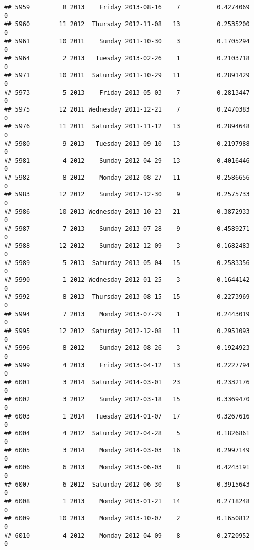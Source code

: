 \documentclass[
]{article}
\begin{document}
\begin{verbatim}
## 5959         8 2013    Friday 2013-08-16    7          0.4274069             0
## 5960        11 2012  Thursday 2012-11-08   13          0.2535200             0
## 5961        10 2011    Sunday 2011-10-30    3          0.1705294             0
## 5964         2 2013   Tuesday 2013-02-26    1          0.2103718             0
## 5971        10 2011  Saturday 2011-10-29   11          0.2891429             0
## 5973         5 2013    Friday 2013-05-03    7          0.2813447             0
## 5975        12 2011 Wednesday 2011-12-21    7          0.2470383             0
## 5976        11 2011  Saturday 2011-11-12   13          0.2894648             0
## 5980         9 2013   Tuesday 2013-09-10   13          0.2197988             0
## 5981         4 2012    Sunday 2012-04-29   13          0.4016446             0
## 5982         8 2012    Monday 2012-08-27   11          0.2586656             0
## 5983        12 2012    Sunday 2012-12-30    9          0.2575733             0
## 5986        10 2013 Wednesday 2013-10-23   21          0.3872933             0
## 5987         7 2013    Sunday 2013-07-28    9          0.4589271             0
## 5988        12 2012    Sunday 2012-12-09    3          0.1682483             0
## 5989         5 2013  Saturday 2013-05-04   15          0.2583356             0
## 5990         1 2012 Wednesday 2012-01-25    3          0.1644142             0
## 5992         8 2013  Thursday 2013-08-15   15          0.2273969             0
## 5994         7 2013    Monday 2013-07-29    1          0.2443019             0
## 5995        12 2012  Saturday 2012-12-08   11          0.2951093             0
## 5996         8 2012    Sunday 2012-08-26    3          0.1924923             0
## 5999         4 2013    Friday 2013-04-12   13          0.2227794             0
## 6001         3 2014  Saturday 2014-03-01   23          0.2332176             0
## 6002         3 2012    Sunday 2012-03-18   15          0.3369470             0
## 6003         1 2014   Tuesday 2014-01-07   17          0.3267616             0
## 6004         4 2012  Saturday 2012-04-28    5          0.1826861             0
## 6005         3 2014    Monday 2014-03-03   16          0.2997149             0
## 6006         6 2013    Monday 2013-06-03    8          0.4243191             0
## 6007         6 2012  Saturday 2012-06-30    8          0.3915643             0
## 6008         1 2013    Monday 2013-01-21   14          0.2718248             0
## 6009        10 2013    Monday 2013-10-07    2          0.1650812             0
## 6010         4 2012    Monday 2012-04-09    8          0.2720952             0

\end{verbatim}
\end{document}

